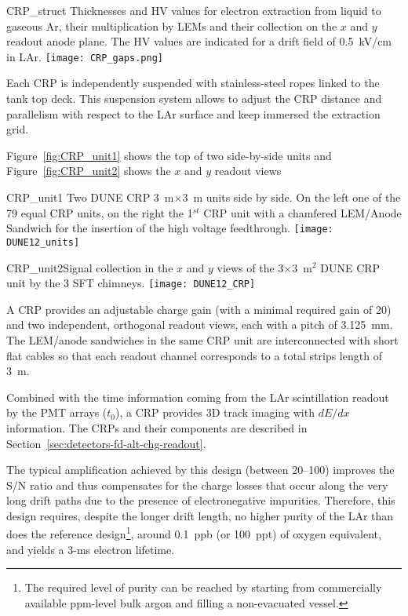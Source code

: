 \begin{cdrfigure}{CRP_struct}
{Thicknesses and HV values for electron extraction from liquid to gaseous Ar, their 
multiplication by LEMs and their collection on the $x$ and $y$ readout anode plane. The 
HV values are indicated for a drift field of 0.5~kV/cm in LAr.}
\texttt{[image: CRP\_gaps.png]}
\end{cdrfigure}

Each CRP  is independently suspended with stainless-steel ropes linked to the tank top deck. This suspension
system allows to adjust the CRP distance and parallelism with respect to the LAr surface and keep immersed the
extraction grid.

Figure~\ref{fig:CRP_unit1} shows the top of two side-by-side units and Figure~\ref{fig:CRP_unit2} shows the
$x$ and $y$ readout views

\begin{cdrfigure}{CRP_unit1} {Two DUNE CRP 3~m$\times$3~m units side by side. On the left one of the 79 equal 
CRP units, on the right the 1$^{st}$ CRP unit with a chamfered LEM/Anode Sandwich  for the insertion of the high voltage feedthrough.}
\texttt{[image: DUNE12\_units]}
\end{cdrfigure}
\begin{cdrfigure}
{CRP_unit2}{Signal collection in the $x$ and $y$ views of the  3$\times$3~m$^2$ DUNE CRP unit by the 3 SFT chimneys.}
\texttt{[image: DUNE12\_CRP]}
\end{cdrfigure}

A CRP provides an adjustable charge gain (with a minimal required gain of 20) and two
independent, orthogonal readout views, each with a pitch of 3.125~mm.  The LEM/anode sandwiches 
in the same CRP unit are interconnected with short flat cables so that each readout
channel corresponds to a total strips length of 3~m.

Combined with the time information coming from the LAr scintillation readout by
the PMT arrays ($t_0$), a CRP provides 3D track imaging with $dE/dx$ information. 
The CRPs and their components are described in Section~\ref{sec:detectors-fd-alt-chg-readout}.

The typical amplification achieved by this design (between 20--100) improves the S/N ratio and thus compensates for the
charge losses that occur along the very long drift paths due to the presence of electronegative
impurities. Therefore, this design requires, despite the longer drift length, no higher purity of the LAr than does the reference 
design\footnote{The required level of purity can be reached by starting from commercially
available ppm-level bulk argon and filling a non-evacuated
vessel\cite{WA105_TDR}. }, 
around 0.1~ppb (or 100~ppt) of oxygen equivalent,
and yields a 3-ms electron lifetime.

